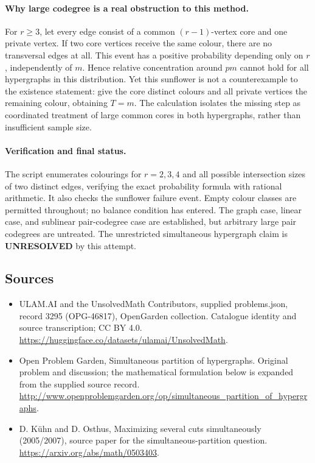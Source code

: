 \documentclass[11pt,a4paper]{article}
\begin{document}
\paragraph{Why large codegree is a real obstruction to this method.}
For $r\ge3$, let every edge consist of a common $(r-1)$-vertex core and one private vertex. If two core vertices receive the same colour, there are no transversal edges at all. This event has a positive probability depending only on $r$, independently of $m$. Hence relative concentration around $pm$ cannot hold for all hypergraphs in this distribution. Yet this sunflower is not a counterexample to the existence statement: give the core distinct colours and all private vertices the remaining colour, obtaining $T=m$. The calculation isolates the missing step as coordinated treatment of large common cores in both hypergraphs, rather than insufficient sample size.

\paragraph{Verification and final status.}
The script enumerates colourings for $r=2,3,4$ and all possible intersection sizes of two distinct edges, verifying the exact probability formula with rational arithmetic. It also checks the sunflower failure event. Empty colour classes are permitted throughout; no balance condition has entered. The graph case, linear case, and sublinear pair-codegree case are established, but arbitrary large pair codegrees are untreated. The unrestricted simultaneous hypergraph claim is \textbf{UNRESOLVED} by this attempt.

\subsection{Sources}
\begin{itemize}
\item[S1] ULAM.AI and the UnsolvedMath Contributors, supplied problems.json, record 3295 (OPG-46817), OpenGarden collection. Catalogue identity and source transcription; CC BY 4.0.
\url{https://huggingface.co/datasets/ulamai/UnsolvedMath}.
\item[S2] Open Problem Garden, Simultaneous partition of hypergraphs. Original problem and discussion; the mathematical formulation below is expanded from the supplied source record.
\url{http://www.openproblemgarden.org/op/simultaneous_partition_of_hypergraphs}.
\item[S3] D. Kühn and D. Osthus, Maximizing several cuts simultaneously (2005/2007), source paper for the simultaneous-partition question.
\url{https://arxiv.org/abs/math/0503403}.

\end{itemize}
\end{document}
